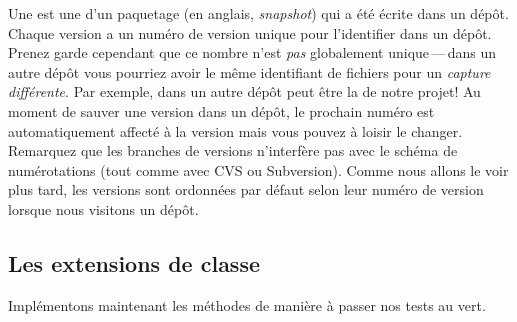\documentclass[a4paper,10pt,twoside]{book}
\begin{document}



Une  est une  d'un
paquetage (en anglais, \emph{snapshot}) %
qui a été écrite dans un dépôt. Chaque version a un numéro de version
unique pour l'identifier dans un dépôt.
Prenez garde cependant que ce nombre n'est \emph{pas} globalement
unique\,---\,dans un autre dépôt vous pourriez avoir le même
identifiant de fichiers pour un \emph{capture différente}.
Par exemple,  dans un autre dépôt peut
être la  de notre
projet!
Au moment de sauver une version dans un dépôt, le prochain numéro est
automatiquement affecté à la version mais vous pouvez à loisir le
changer.
Remarquez que les branches de versions n'interfère pas avec le schéma
de numérotations (tout comme avec CVS ou Subversion). Comme nous
allons le voir plus tard, les versions sont ordonnées par défaut selon
leur numéro de version lorsque nous visitons un dépôt.

\subsection{Les extensions de classe}

Implémentons maintenant les méthodes de manière à passer nos tests au
vert.
\end{document}
